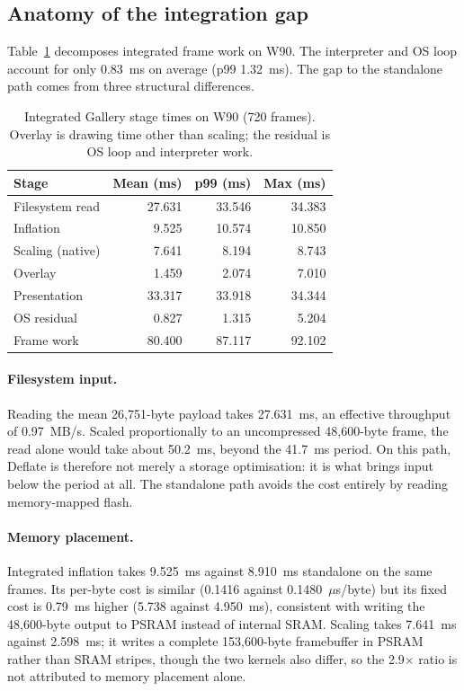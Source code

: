 \documentclass[11pt,twocolumn]{article}
\begin{document}
\subsection{Anatomy of the integration gap}
\label{sec:gap}

Table~\ref{tab:gallery} decomposes integrated frame work on W90.  The
interpreter and OS loop account for only 0.83~ms on average (p99 1.32~ms).
The gap to the standalone path comes from three structural differences.

\begin{table}[t]
\centering
\caption{Integrated Gallery stage times on W90 (720 frames).  Overlay is
drawing time other than scaling; the residual is OS loop and interpreter
work.}
\label{tab:gallery}
\small
\setlength{\tabcolsep}{4pt}
\begin{tabular}{lrrr}
\toprule
Stage & Mean (ms) & p99 (ms) & Max (ms) \\
\midrule
Filesystem read & 27.631 & 33.546 & 34.383 \\
Inflation & 9.525 & 10.574 & 10.850 \\
Scaling (native) & 7.641 & 8.194 & 8.743 \\
Overlay & 1.459 & 2.074 & 7.010 \\
Presentation & 33.317 & 33.918 & 34.344 \\
OS residual & 0.827 & 1.315 & 5.204 \\
\midrule
Frame work & 80.400 & 87.117 & 92.102 \\
\bottomrule
\end{tabular}
\end{table}

\paragraph{Filesystem input.}  Reading the mean 26,751-byte payload takes
27.631~ms, an effective throughput of 0.97~MB/s.  Scaled proportionally to an
uncompressed 48,600-byte frame, the read alone would take about 50.2~ms,
beyond the 41.7~ms period.  On this path, Deflate is therefore not merely a
storage optimisation: it is what brings input below the period at all.  The
standalone path avoids the cost entirely by reading memory-mapped flash.

\paragraph{Memory placement.}  Integrated inflation takes 9.525~ms against
8.910~ms standalone on the same frames.  Its per-byte cost is similar (0.1416
against 0.1480~$\mu$s/byte) but its fixed cost is 0.79~ms higher (5.738
against 4.950~ms), consistent with writing the 48,600-byte output to PSRAM
instead of internal SRAM.  Scaling takes 7.641~ms against 2.598~ms; it writes
a complete 153,600-byte framebuffer in PSRAM rather than SRAM stripes, though
the two kernels also differ, so the 2.9$\times$ ratio is not attributed to
memory placement alone.
\end{document}
